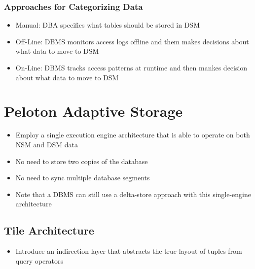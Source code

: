 \documentclass[11pt]{article}
\begin{document}
\begin{itemize}
        \subsubsection*{Approaches for Categorizing Data}
        \begin{itemize}
            \item Manual: DBA specifies what tables should be stored in DSM
            \item Off-Line: DBMS monitors access logs offline and them makes decisions about what data to move to DSM
            \item On-Line: DBMS tracks access patterns at runtime and then mankes decision about what data to move to DSM
        \end{itemize}
    \end{itemize}

\section{Peloton Adaptive Storage~\cite{p583-arulraj}}
\begin{itemize}
    \item Employ a single execution engine architecture that is able to operate on both NSM and DSM data
    \item No need to store two copies of the database
    \item No need to sync multiple database segments
    \item Note that a DBMS can still use a delta-store approach with this single-engine architecture
\end{itemize}

    \subsection*{Tile Architecture}
    \begin{itemize}
        \item Introduce an indirection layer that abstracts the true layout of tuples from query operators
    \end{itemize}



    \newpage
    
    
\end{document}
